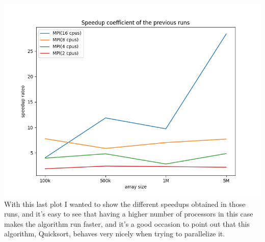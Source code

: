 \documentclass{article}
\begin{document}
\includegraphics[scale=.6]{speedup.png}
With this last plot I wanted to show the different speedups obtained in those runs, and it's easy 
to see that having a higher number of processors in this case makes the algorithm run faster, and
it's a good occasion to point out that this algorithm, Quicksort, behaves very nicely when trying 
to parallelize it.
\end{document}
